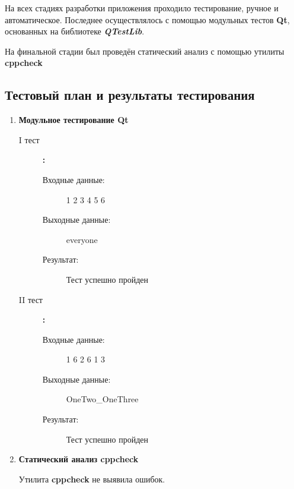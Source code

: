 \documentclass[12pt,a4paper]{report}
\begin{document}
На всех стадиях разработки приложения проходило тестирование, ручное и автоматическое. Последнее осуществлялось с помощью модульных тестов \textbf{Qt}, основанных на библиотеке  \textit{\textbf{QTestLib}}.

На финальной стадии был проведён статический анализ с помощью утилиты \textbf{cppcheck}%
\subsection{Тестовый план и результаты тестирования}
\begin{enumerate}
\item \textbf{Модульное тестирование Qt}
\begin{description}
\item[I тест]\textbf{:}

\begin{flushleft}
\begin{description}
\item[Входные данные:] 1 2 3 4 5 6
\item[Выходные данные:] everyone
\item[Результат:] Тест успешно пройден
\end{description}
\end{flushleft}

\end{description}

\begin{description}
\item[II тест]\textbf{:}

\begin{flushleft}
\begin{description}
\item[Входные данные:] 1 6 2 6 1 3
\item[Выходные данные:] OneTwo\_OneThree
\item[Результат:] Тест успешно пройден
\end{description}
\end{flushleft}

\end{description}

\item \textbf{Статический анализ cppcheck}

Утилита \textbf{cppcheck} не выявила ошибок.
\end{enumerate}
\end{document}
